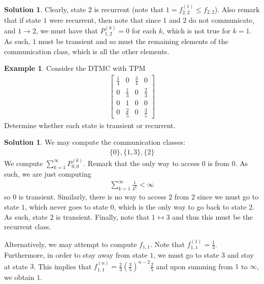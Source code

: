 \documentclass[11pt]{amsart}
\theoremstyle{definition}
\newtheorem{example}[theorem]{Example}
\newtheorem{solution}[theorem]{Solution}
\numberwithin{equation}{section}
\begin{document}
 \addtocounter{theorem}{-1}
 \begin{solution}
     Clearly, state $2$ is recurrent (note that $1=f_{2,2}^{(1)}\le f_{2,2}$). Also remark that if state $1$ were recurrent, then note that since $1$ and $2$ do not communicate, and $1\to 2$, we must have that $P_{1,2}^{(k)}=0$ for each $k$, which is not true for $k=1$. As such, $1$ must be transient and so must the remaining elements of the communication class, which is all the other elements.
 \end{solution}
 \begin{example}
     Consider the DTMC with TPM
     \begin{align*}
         \begin{bmatrix}
             \frac{1}{4} & 0 & \frac{3}{4} & 0\\
             0 & \frac{1}{3} & 0 & \frac{2}{3}\\
             0 & 1 & 0 & 0\\
             0 & \frac{2}{5} & 0 & \frac{3}{5}
         \end{bmatrix}
     \end{align*}
     Determine whether each state is transient or recurrent.
 \end{example}
 \addtocounter{theorem}{-1}
 \begin{solution}
     We may compute the communication classes:
     \begin{align*}
         \{0\}, \{1,3\}, \{2\}
     \end{align*}
     We compute $\sum_{k=1}^\infty P_{0,0}^{(k)}$. Remark that the only way to access $0$ is from $0$. As such, we are just computing
     \begin{align*}
         \sum_{k=1}^\infty \frac{1}{4^k}<\infty
     \end{align*}
     so $0$ is transient. Similarly, there is no way to access $2$ from $2$ since we must go to state $1$, which never goes to state $0$, which is the only way to go back to state $2$. As such, state $2$ is transient. Finally, note that $1\leftrightarrow 3$ and thus this must be the recurrent class.

     Alternatively, we may attempt to compute $f_{1,1}$. Note that $f_{1,1}^{(1)}=\frac{1}{3}$. Furthermore, in order to stay away from state $1$, we must go to state $3$ and stay at state $3$. This implies that $f_{1,1}^{(n)}=\frac{2}{3}\left(\frac{3}{5}\right)^{n-2}\frac{2}{5}$ and upon summing from $1$ to $\infty$, we obtain $1$.
 \end{solution}
\end{document}
